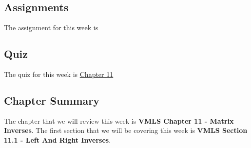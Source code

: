 \subsection{Assignments}

The assignment for this week is   

\subsection{Quiz}

The quiz for this week is \href{https://applied.cs.colorado.edu/mod/quiz/view.php?id=50812}{Chapter 11} \textbullet {}  

\subsection{Chapter Summary}

The chapter that we will review this week is \textbf{VMLS Chapter 11 - Matrix Inverses}. The first section that we will be covering this week is \textbf{VMLS Section 11.1 - Left And Right Inverses}.

